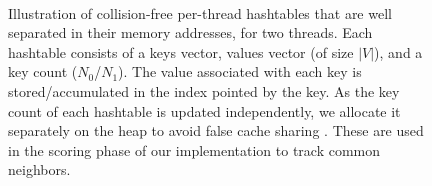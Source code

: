 \begin{figure}[hbtp]
  \centering
   \\[-2ex]
  \caption{Illustration of collision-free per-thread hashtables that are well separated in their memory addresses, for two threads. Each hashtable consists of a keys vector, values vector (of size $|V|$), and a key count ($N_0$/$N_1$). The value associated with each key is stored/accumulated in the index pointed by the key. As the key count of each hashtable is updated independently, we allocate it separately on the heap to avoid false cache sharing \cite{sahu2023gvelouvain}. These are used in the scoring phase of our implementation to track common neighbors.}
  \label{fig:about-hashtable}
\end{figure}
